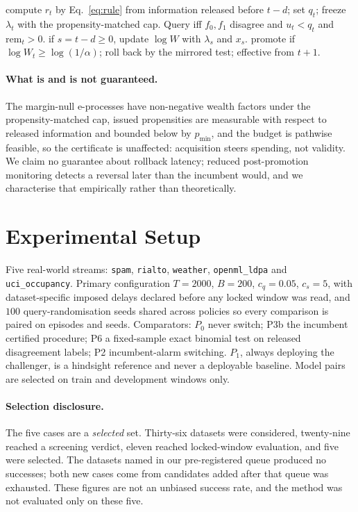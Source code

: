 \documentclass{article}
\begin{document}
\begin{algorithm}[t]
\caption{Settled-decision acquisition (one event)}
\label{alg:main}
\begin{algorithmic}[1]
 compute $r_t$ by Eq.~\eqref{eq:rule} from information released before
$t-d$; set $q_t$; freeze $\lambda_t$ with the propensity-matched cap.
\STATE Query iff $f_0,f_1$ disagree and $u_t<q_t$ and $\mathrm{rem}_t>0$.
 if $s=t-d\ge0$, update $\log W$ with $\lambda_s$ and $x_s$.
 promote if $\log W_t\ge\log(1/\alpha)$; roll back by the mirrored test;
effective from $t+1$.
\end{algorithmic}
\end{algorithm}

\paragraph{What is and is not guaranteed.} The margin-null e-processes have non-negative wealth
factors under the propensity-matched cap, issued propensities are measurable with respect to
released information and bounded below by $p_{\min}$, and the budget is pathwise feasible, so the
certificate is unaffected: acquisition steers spending, not validity. We claim no guarantee about
rollback latency; reduced post-promotion monitoring detects a reversal later than the incumbent
would, and we characterise that empirically rather than theoretically.

\section{Experimental Setup}
Five real-world streams: \texttt{spam}, \texttt{rialto}, \texttt{weather}, \texttt{openml\_ldpa}
and \texttt{uci\_occupancy}. Primary configuration $T=2000$, $B=200$, $c_q=0.05$, $c_s=5$, with
dataset-specific imposed delays declared before any locked window was read, and $100$
query-randomisation seeds shared across policies so every comparison is paired on episodes and
seeds. Comparators: $P_0$ never switch; \textsf{P3b} the incumbent certified procedure;
\textsf{P6} a fixed-sample exact binomial test on released disagreement labels; \textsf{P2}
incumbent-alarm switching. $P_1$, always deploying the challenger, is a hindsight reference and
never a deployable baseline. Model pairs are selected on train and development windows only.

\paragraph{Selection disclosure.} The five cases are a \emph{selected} set. Thirty-six datasets
were considered, twenty-nine reached a screening verdict, eleven reached locked-window evaluation,
and five were selected. The datasets named in our pre-registered queue produced no successes; both
new cases come from candidates added after that queue was exhausted. These figures are not an
unbiased success rate, and the method was not evaluated only on these five.
\end{document}
